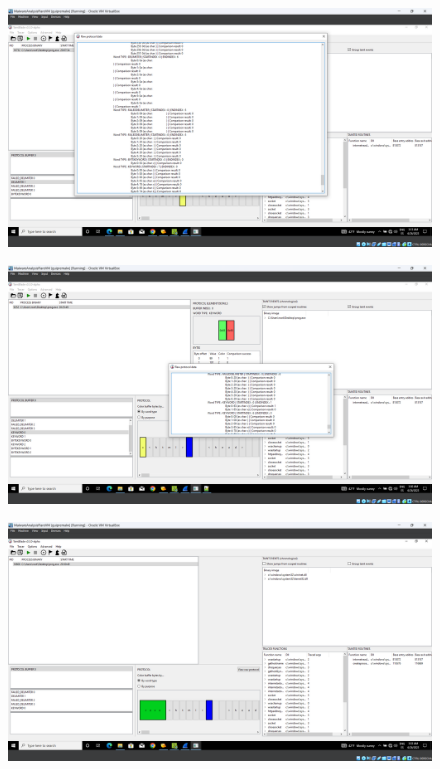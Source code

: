 \documentclass[conference]{IEEEtran}
\begin{document}
\begin{figure}
    \centerline{\includegraphics[width=\textwidth]{images/sch_s6.png}}
    \caption{}
    \label{figure:ap_sch_s6}
\end{figure}


\begin{figure}
    \centerline{\includegraphics[width=\textwidth]{images/sch_s7.png}}
    \caption{}
    \label{figure:ap_sch_s7}
\end{figure}

\begin{figure}
    \centerline{\includegraphics[width=\textwidth]{images/sch_s8.png}}
    \caption{}
    \label{figure:ap_sch_s8}
\end{figure}
\end{document}
